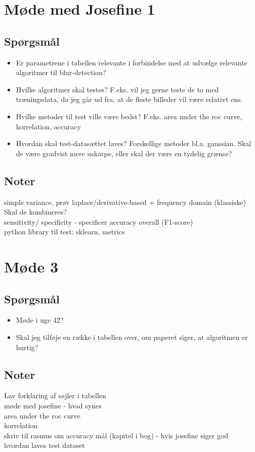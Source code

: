 \section*{Møde med Josefine 1}
\subsection*{Spørgsmål}
\begin{itemize}
    \item Er parametrene i tabellen relevante i forbindelse med at udvælge relevante algoritmer til blur-detection?
    \item Hvilke algoritmer skal testes? F.eks. vil jeg gerne teste de to med træningsdata, da jeg går ud fra, at de fleste billeder vil være relativt ens.
    \item Hvilke metoder til test ville være bedst? F.eks. area under the roc curve, korrelation, accuracy
    \item Hvordan skal test-datasættet laves? Forskellige metoder bl.a. gaussian. Skal de være gradvist mere uskarpe, eller skal der være en tydelig grænse?
\end{itemize}
\subsection*{Noter}
simple variance, 
prøv laplace/derivative-based + frequency domain (klassiske)\\
Skal de kombineres?\\
sensitivity/ specificity - specificer accuracy overall (F1-score)\\
python library til test: sklearn, metrics


\section*{Møde 3}
\subsection*{Spørgsmål}
\begin{itemize}
    \item Møde i uge 42?
    \item Skal jeg tilføje en række i tabellen over, om paperet siger, at algoritmen er hurtig?
\end{itemize}
\subsection*{Noter}
Lav forklaring af søjler i tabellen\\
møde med josefine - hvad synes \\
area under the roc curve\\
korrelation\\
skriv til rasmus om accuracy mål (kapitel i bog) - hvis josefine siger god\\
hvordan laves test dataset\\


